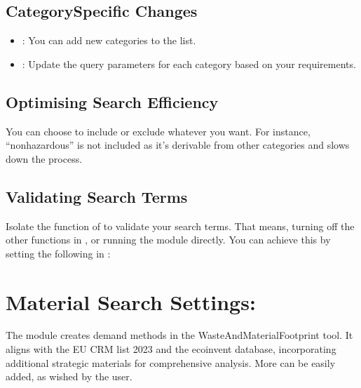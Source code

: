 \documentclass[letterpaper,10pt,english]{sphinxmanual}
\begin{document}
\subsection{Category\sphinxhyphen{}Specific Changes}
\label{\detokenize{configuration:category-specific-changes}}\begin{itemize}
\item {} 
\sphinxAtStartPar
{}: You can add new categories to the  list.

\item {} 
\sphinxAtStartPar
{}: Update the query parameters for each category based on your requirements.

\end{itemize}


\subsection{Optimising Search Efficiency}
\label{\detokenize{configuration:optimising-search-efficiency}}
\sphinxAtStartPar
You can choose to include or exclude whatever you want. For instance, “non\sphinxhyphen{}hazardous” is not included as it’s derivable from other categories and slows down the process.


\subsection{Validating Search Terms}
\label{\detokenize{configuration:validating-search-terms}}
\sphinxAtStartPar
Isolate the function of  to validate your search terms. That means, turning off the other functions in , or running the module directly. You can achieve this by setting the following in :

\begin{sphinxVerbatim}[commandchars=\\\{\}]
  
  
  
  
\end{sphinxVerbatim}


\section{Material Search Settings: }
\label{\detokenize{configuration:material-search-settings-queries-materials-py}}
\sphinxAtStartPar
The  module creates demand methods in the WasteAndMaterialFootprint tool. It aligns with the EU CRM list 2023 and the ecoinvent database, incorporating additional strategic materials for comprehensive analysis. More can be easily added, as wished by the user.
\end{document}
